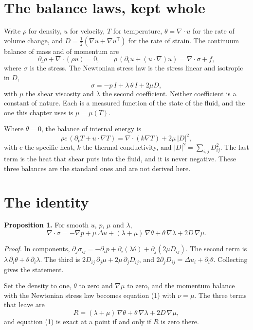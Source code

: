 \section{The balance laws, kept whole}

Write $\rho$ for density, $u$ for velocity, $T$ for temperature, $\theta = \nabla\cdot u$ for the
rate of volume change, and $D = \tfrac12(\nabla u + \nabla u^{\mathsf T})$ for the rate of strain.
The continuum balance of mass and of momentum are
\[
\partial_t\rho + \nabla\cdot(\rho u) = 0,
\qquad
\rho\,(\partial_t u + (u\cdot\nabla)u) = \nabla\cdot\sigma + f,
\]
where $\sigma$ is the stress. The Newtonian stress law is the stress linear and isotropic in $D$,
\[
\sigma = -p\,I + \lambda\,\theta\,I + 2\mu D,
\]
with $\mu$ the shear viscosity and $\lambda$ the second coefficient. Neither coefficient is a
constant of nature. Each is a measured function of the state of the fluid, and the one this
chapter uses is $\mu = \mu(T)$.

Where $\theta = 0$, the balance of internal energy is
\[
\rho c\,(\partial_t T + u\cdot\nabla T) = \nabla\cdot(k\nabla T) + 2\mu\,|D|^2,
\]
with $c$ the specific heat, $k$ the thermal conductivity, and $|D|^2 = \sum_{i,j} D_{ij}^2$. The
last term is the heat that shear puts into the fluid, and it is never negative. These three balances
are the standard ones and are not derived here.

\section{The identity}

\textbf{Proposition 1.} For smooth $u$, $p$, $\mu$ and $\lambda$,
\[
\nabla\cdot\sigma = -\nabla p + \mu\,\Delta u + (\lambda+\mu)\,\nabla\theta + \theta\,\nabla\lambda
+ 2D\,\nabla\mu .
\]

\emph{Proof.} In components,
$\partial_j\sigma_{ij} = -\partial_i p + \partial_i(\lambda\theta) + \partial_j(2\mu D_{ij})$.
The second term is $\lambda\,\partial_i\theta + \theta\,\partial_i\lambda$. The third is
$2D_{ij}\,\partial_j\mu + 2\mu\,\partial_j D_{ij}$, and
$2\partial_j D_{ij} = \Delta u_i + \partial_i\theta$. Collecting gives the statement.
\hfill\qedsymbol

Set the density to one, $\theta$ to zero and $\nabla\mu$ to zero, and the momentum balance with the
Newtonian stress law becomes equation (1) with $\nu = \mu$. The three terms that leave are
\[
R = (\lambda+\mu)\,\nabla\theta + \theta\,\nabla\lambda + 2D\,\nabla\mu ,
\]
and equation (1) is exact at a point if and only if $R$ is zero there.

